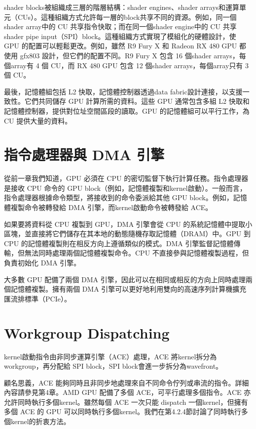 shader blocks被組織成三層的階層結構：shader engines、shader arrays和運算單元（CUs）。這種組織方式允許每一層的block共享不同的資源。例如，同一個shader array中的 CU 共享指令快取；而在同一個shader engine中的 CU 共享shader pipe input（SPI）block。這種組織方式實現了模組化的硬體設計，使 GPU 的配置可以輕鬆更改。例如，雖然 R9 Fury X 和 Radeon RX 480 GPU 都使用 gfx803 設計，但它們的配置不同。R9 Fury X 包含 16 個shader arrays，每個array有 4 個 CU，而 RX 480 GPU 包含 12 個shader arrays，每個array只有 3 個 CU。

最後，記憶體組包括 L2 快取，記憶體控制器透過data fabric設計連接，以支援一致性。它們共同儲存 GPU 計算所需的資料。這些 GPU 通常包含多組 L2 快取和記憶體控制器，提供對位址空間區段的讀取。GPU 的記憶體組可以平行工作，為 CU 提供大量的資料。

\section{指令處理器與 DMA 引擎}
從前一章我們知道，GPU 必須在 CPU 的密切監督下執行計算任務。指令處理器是接收 CPU 命令的 GPU block（例如，記憶體複製和kernel啟動）。一般而言，指令處理器根據命令類型，將接收到的命令委派給其他 GPU block。例如，記憶體複製命令被轉發給 DMA 引擎，而kernel啟動命令被轉發給 ACE。

如果要將資料從 CPU 複製到 GPU，DMA 引擎會從 CPU 的系統記憶體中提取小區塊，並直接將它們儲存在其本地的動態隨機存取記憶體（DRAM）中。GPU 到 CPU 的記憶體複製則在相反方向上遵循類似的模式。DMA 引擎監督記憶體傳輸，但無法同時處理兩個記憶體複製命令。CPU 不直接參與記憶體複製過程，但負責初始化 DMA 引擎。

大多數 GPU 配備了兩個 DMA 引擎，因此可以在相同或相反的方向上同時處理兩個記憶體複製。擁有兩個 DMA 引擎可以更好地利用雙向的高速序列計算機擴充匯流排標準（PCIe）。

\section{ Workgroup Dispatching}

kernel啟動指令由非同步運算引擎（ACE）處理，ACE 將kernel拆分為workgroup，再分配給 SPI block，SPI block會進一步拆分為wavefront。

顧名思義，ACE 能夠同時且非同步地處理來自不同命令佇列或串流的指令。詳細內容請參見第4章。AMD GPU 配備了多個 ACE，可平行處理多個指令。ACE 亦允許同時執行多個kernel。雖然每個 ACE 一次只能 dispatch 一個kernel，但擁有多個 ACE 的 GPU 可以同時執行多個kernel。我們在第4.2.4節討論了同時執行多個kernel的折衷方法。


